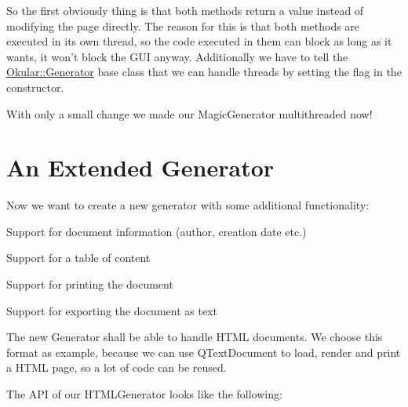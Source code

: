 So the first obviously thing is that both methods return a value instead of modifying the page directly. The reason for this is that both methods are executed in its own thread, so the code executed in them can block as long as it wants, it won't block the G\+U\+I anyway. Additionally we have to tell the \hyperlink{classOkular_1_1Generator}{Okular\+::\+Generator} base class that we can handle threads by setting the flag in the constructor.

With only a small change we made our Magic\+Generator multithreaded now!\hypertarget{okular_generators_okular_generators_extended}{}\section{An Extended Generator}\label{okular_generators_okular_generators_extended}
Now we want to create a new generator with some additional functionality\+:

\begin{DoxyItemize}
\item Support for document information (author, creation date etc.) \item Support for a table of content \item Support for printing the document \item Support for exporting the document as text\end{DoxyItemize}
The new Generator shall be able to handle H\+T\+M\+L documents. We choose this format as example, because we can use Q\+Text\+Document to load, render and print a H\+T\+M\+L page, so a lot of code can be reused.

The A\+P\+I of our H\+T\+M\+L\+Generator looks like the following\+:


